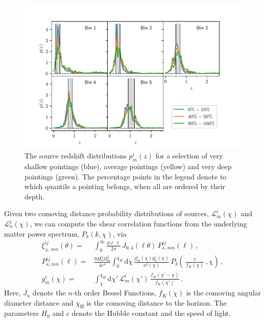 \documentclass{aa}
\renewcommand{\rm}{\mathrm}
\begin{document}
\begin{figure}
\centering
\includegraphics[trim = {1cm 0 1.2cm 0.1cm}, clip, width=\linewidth]{images/dist_z_all.pdf}
\caption{The source redshift distributions $p^i_m(z)$ for a selection of very shallow pointings (blue), average pointings (yellow) and very deep pointings (green). The percentage points in the legend denote to which quantile a pointing belongs, when all are ordered by their depth.}
\label{fig:nofz_quantiles}
\end{figure}

Given two comoving distance probability distributions of sources, $\mathcal{L}^i_m(\chi)$ and $\mathcal{L}^j_n(\chi)$, we can compute the shear correlation functions from the underlying matter power spectrum, $P_\delta(k,\chi)$, via \citep{1992ApJ...388..272K} \begin{align}
\label{eq:xipm-pkappa}
\xi_{\pm,mn}^{ij}(\theta) =& \int_0^\infty \frac{{\rm d}\ell\,\ell}{2\pi}\, J_{0,4}(\ell\theta)\, P^{ij}_{\kappa,mn}(\ell)\, , \\
\label{eq:pkappa-pdelta/lenseff}
P^{ij}_{\kappa,mn}(\ell) =& \frac{9 H_0^4\Omega_{\rm m}^2}{4c^4}\int_0^{\chi_{\rm{H}}} {\rm d}\chi\, \frac{g^i_m(\chi)g^j_n(\chi)}{a^2(\chi)}\, P_\delta\left(\frac{\ell}{f_K(\chi)},\chi\right)\, , \\
\label{eq:lenseff}
g^i_m(\chi) =& \int_\chi^{\chi_{\rm{H}}} {\rm d}\chi' \, \mathcal{L}^i_m(\chi') \, \frac{f_K(\chi'-\chi)}{f_K(\chi')}\, .
\end{align}
Here, $J_n$ denote the $n$-th order Bessel Functions, $f_K(\chi)$ is the comoving angular diameter distance and $\chi_{\rm{H}}$ is the comoving distance to the horizon. The parameters $H_0$ and $c$ denote the Hubble constant and the speed of light.
\end{document}
